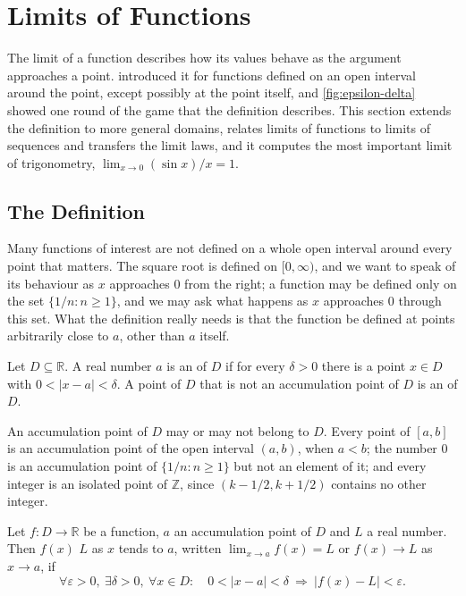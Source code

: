 \section{Limits of Functions}
\label{sec:function-limits}

The limit of a function describes how its values behave as the argument approaches a point.  introduced it for functions defined on an open interval around the point, except possibly at the point itself, and \cref{fig:epsilon-delta} showed one round of the game that the definition describes. This section extends the definition to more general domains, relates limits of functions to limits of sequences and transfers the limit laws, and it computes the most important limit of trigonometry, $\lim_{x\to0}(\sin x)/x=1$.

\subsection{The Definition}

Many functions of interest are not defined on a whole open interval around every point that matters. The square root is defined on $[0,\infty)$, and we want to speak of its behaviour as $x$ approaches $0$ from the right; a function may be defined only on the set $\{1/n: n\ge1\}$, and we may ask what happens as $x$ approaches $0$ through this set. What the definition really needs is that the function be defined at points arbitrarily close to $a$, other than $a$ itself.

\begin{definition}
\label{def:accumulation}
Let $D\subseteq\mathbb R$. A real number $a$ is an  of $D$ if for every $\delta>0$ there is a point $x\in D$ with $0<|x-a|<\delta$. A point of $D$ that is not an accumulation point of $D$ is an  of $D$.
\end{definition}

An accumulation point of $D$ may or may not belong to $D$. Every point of $[a,b]$ is an accumulation point of the open interval $(a,b)$, when $a<b$; the number $0$ is an accumulation point of $\{1/n: n\ge1\}$ but not an element of it; and every integer is an isolated point of $\mathbb Z$, since $(k-1/2,k+1/2)$ contains no other integer.

\begin{definition}
\label{def:function-limit}
Let $f\colon D\to\mathbb R$ be a function, $a$ an accumulation point of $D$ and $L$ a real number. Then $f(x)$  $L$ as $x$ tends to $a$, written $\lim_{x\to a}f(x)=L$ or $f(x)\to L$ as $x\to a$, if
\begin{equation}
\forall\varepsilon>0,\ \exists\delta>0,\ \forall x\in D:\quad0<|x-a|<\delta\ \Rightarrow\ |f(x)-L|<\varepsilon .
\label{eq:function-limit}
\end{equation}
\end{definition}


